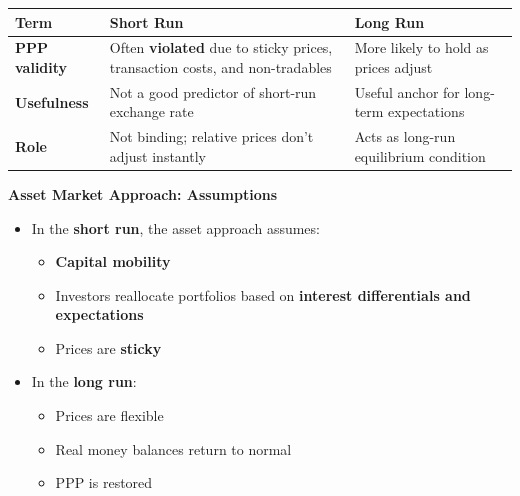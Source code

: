 \documentclass[
]{article}
\providecommand{\tightlist}{%
  \setlength{\itemsep}{0pt}\setlength{\parskip}{0pt}}
\begin{document}
\begin{longtable}[]{@{}
  >{\raggedright\arraybackslash}p{}
  >{\raggedright\arraybackslash}p{}
  >{\raggedright\arraybackslash}p{}@{}}
\toprule\noalign{}
\begin{minipage}[b]{\linewidth}\raggedright
Term
\end{minipage} & \begin{minipage}[b]{\linewidth}\raggedright
Short Run
\end{minipage} & \begin{minipage}[b]{\linewidth}\raggedright
Long Run
\end{minipage} \\
\midrule\noalign{}
\endhead
\bottomrule\noalign{}
\endlastfoot
\textbf{PPP validity} & Often \textbf{violated} due to sticky prices,
transaction costs, and non-tradables & More likely to hold as prices
adjust \\
\textbf{Usefulness} & Not a good predictor of short-run exchange rate &
Useful anchor for long-term expectations \\
\textbf{Role} & Not binding; relative prices don't adjust instantly &
Acts as long-run equilibrium condition \\
\end{longtable}

\textbf{Asset Market Approach: Assumptions}

\begin{itemize}
\tightlist
\item
  In the \textbf{short run}, the asset approach assumes:

  \begin{itemize}
  \tightlist
  \item
    \textbf{Capital mobility}
  \item
    Investors reallocate portfolios based on \textbf{interest
    differentials and expectations}
  \item
    Prices are \textbf{sticky}
  \end{itemize}
\item
  In the \textbf{long run}:

  \begin{itemize}
  \tightlist
  \item
    Prices are flexible
  \item
    Real money balances return to normal
  \item
    PPP is restored
  \end{itemize}
\end{itemize}
\end{document}
